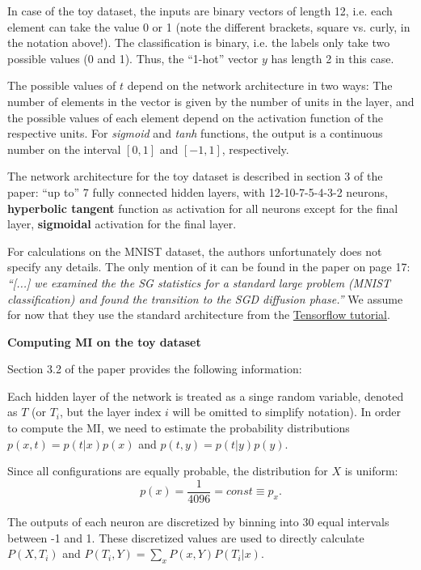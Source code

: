 \documentclass[12pt]{report}
\begin{document}
In case of the toy dataset, the inputs are binary vectors of length 12, i.e. each element can take the value 0 or 1 (note the different brackets, square vs. curly, in the notation above!). The classification is binary, i.e. the labels only take two possible values (0 and 1). Thus, the ``1-hot'' vector $y$ has length 2 in this case.
 
The possible values of $t$ depend on the network architecture in two ways: The number of elements in the vector is given by the number of units in the layer, and the possible values of each element depend on the activation function of the respective units. For {\it sigmoid} and {\it tanh} functions, the output is a continuous number on the interval $[0,1]$ and $[-1,1]$, respectively.

The network architecture for the toy dataset is described in section 3 of the paper: ``up to'' 7 fully connected hidden layers, with 12-10-7-5-4-3-2 neurons, {\bf hyperbolic tangent} function as activation for all neurons except for the final layer, {\bf sigmoidal} activation for the final layer.

For calculations on the MNIST dataset, the authors unfortunately does not specify any details. The only mention of it can be found in the paper on page 17: {\it ``[...] we examined the the SG statistics for a standard large problem (MNIST classification) and found the transition to the SGD diffusion phase.''} We assume for now that they use the standard architecture from the \href{https://www.tensorflow.org/get_started/mnist/beginners}{Tensorflow tutorial}.


\vspace{1cm}
{\bf Computing MI on the toy dataset}

Section 3.2 of the paper provides the following information:

Each hidden layer of the network is treated as a singe random variable, denoted as $T$ (or $T_i$, but the layer index $i$ will be omitted to simplify notation).
In order to compute the MI, we need to estimate the probability distributions $p(x,t)=p(t|x)p(x)$ and $p(t,y)=p(t|y)p(y)$.

Since all configurations are equally probable, the distribution for $X$ is uniform:
\begin{equation}
p(x) = \frac{1}{4096} = const \equiv p_x.
\end{equation}

The outputs of each neuron are discretized by binning into 30 equal intervals between -1 and 1. These discretized values are used to directly calculate $P(X, T_i)$ and $P(T_i, Y) = \sum_x P(x,Y)P(T_i | x)$.
\end{document}

